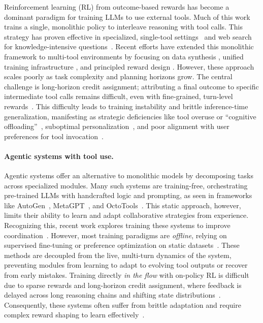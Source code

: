 Reinforcement learning (RL) from outcome-based rewards has become a dominant paradigm for training LLMs to use external tools. Much of this work trains a single, monolithic policy to interleave reasoning with tool calls. This strategy has proven effective in specialized, single-tool settings~\citep{mai2025agent, xue2025simpletir, feng2025retool, li2025torl} and web search for knowledge-intensive questions~\citep{chen2025research, jin2025search, song2025r1, li2025search, sun2025zerosearch}. Recent efforts have extended this monolithic framework to multi-tool environments by focusing on data synthesis \citep{dong2025tool}, unified training infrastructure \citep{jiang2025verltool}, and principled reward design \citep{qian2025toolrl, zhang2025nemotron}. However, these approach scales poorly as task complexity and planning horizons grow. The central challenge is long-horizon credit assignment; attributing a final outcome to specific intermediate tool calls remains difficult, even with fine-grained, turn-level rewards~\citep{zeng2025reinforcing, wang2025stepsearch}. This difficulty leads to training instability and brittle inference-time generalization, manifesting as strategic deficiencies like tool overuse or ``cognitive offloading''~\citep{Wang2025ActingLI, qian2025smart}, suboptimal personalization~\citep{cheng2025toolspectrum}, and poor alignment with user preferences for tool invocation~\citep{huang2025ttpa}.

\paragraph{Agentic systems with tool use.}
Agentic systems offer an alternative to monolithic models by decomposing tasks across specialized modules. Many such systems are training-free, orchestrating pre-trained LLMs with handcrafted logic and prompting, as seen in frameworks like AutoGen~\citep{wu2024autogen}, MetaGPT~\citep{hong2024metagpt}, and OctoTools~\citep{lu2025octotools}. This static approach, however, limits their ability to learn and adapt collaborative strategies from experience. Recognizing this, recent work explores training these systems to improve coordination~\citep{deng2025pe, liao2025marft}. However, most training paradigms are \emph{offline}, relying on supervised fine-tuning or preference optimization on static datasets~\citep{motwani2024malt, park2025maporl}. These methods are decoupled from the live, multi-turn dynamics of the system, preventing modules from learning to adapt to evolving tool outputs or recover from early mistakes. Training directly \emph{in the flow} with on-policy RL is difficult due to sparse rewards and long-horizon credit assignment, where feedback is delayed across long reasoning chains and shifting state distributions~\citep{wang2025ragen}. Consequently, these systems often suffer from brittle adaptation and require complex reward shaping to learn effectively~\citep{wang2025spa}.



